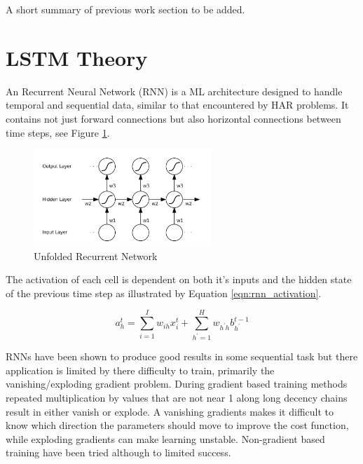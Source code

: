 A short summary of previous work section to be added.


\section{LSTM Theory} 
\label{sec:lstm_therory}
An Recurrent Neural Network (RNN) is a ML architecture designed to handle temporal and sequential data, similar to that encountered by HAR problems. It contains not just forward connections but also horizontal connections between time steps, see Figure \ref{fig:rnn_structure}.

\begin{figure}[!hbt]
    \centering
    \includegraphics[width=0.6\textwidth]{Figures/lstm/rnn_structure.png}
    \caption{Unfolded Recurrent Network\cite{Graves2012}}
    \label{fig:rnn_structure}
\end{figure}

The activation of each cell is dependent on both it's inputs and the hidden state of the previous time step as illustrated by Equation \ref{eqn:rnn_activation}.\cite{Graves2012}

\begin{equation}
    a_h^t = \sum_{i=1}^I w_{ih}x^t_i + \sum_{h^\prime=1}^H w_{h^\prime h} b_{h^\prime}^{t-1}
    \label{eqn:rnn_activation}
\end{equation}

RNNs have been shown to produce good results in some sequential task but there application is limited by there difficulty to train, primarily the vanishing/exploding gradient problem. During gradient based training methods repeated multiplication by values that are not near 1 along long decency chains result in either vanish or explode. A vanishing gradients makes it difficult to know which direction the parameters should move to improve the cost function, while exploding gradients can make learning unstable. Non-gradient based training have been tried although to limited success. \cite{Graves2012, Goodfellow2015}


